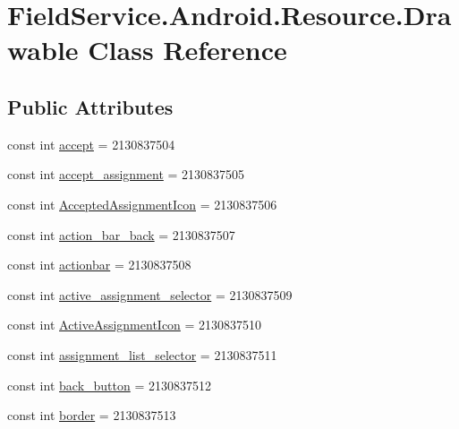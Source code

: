 \hypertarget{class_field_service_1_1_android_1_1_resource_1_1_drawable}{\section{Field\+Service.\+Android.\+Resource.\+Drawable Class Reference}
\label{class_field_service_1_1_android_1_1_resource_1_1_drawable}
}
\subsection*{Public Attributes}
\begin{DoxyCompactItemize}
\item 
const int \hyperlink{class_field_service_1_1_android_1_1_resource_1_1_drawable_ad013b2e6443b9014fe80a8e59c9bb71c}{accept} = 2130837504
\item 
const int \hyperlink{class_field_service_1_1_android_1_1_resource_1_1_drawable_ae043a030a051284c29e6a9320c95e488}{accept\+\_\+assignment} = 2130837505
\item 
const int \hyperlink{class_field_service_1_1_android_1_1_resource_1_1_drawable_a6e30bb07d84123dba13d9adfe455ab4d}{Accepted\+Assignment\+Icon} = 2130837506
\item 
const int \hyperlink{class_field_service_1_1_android_1_1_resource_1_1_drawable_a2bfa32340ccc1e11c820c29d106cc2a9}{action\+\_\+bar\+\_\+back} = 2130837507
\item 
const int \hyperlink{class_field_service_1_1_android_1_1_resource_1_1_drawable_acbe6f5b1c0dae0870d53bc9fe62fa617}{actionbar} = 2130837508
\item 
const int \hyperlink{class_field_service_1_1_android_1_1_resource_1_1_drawable_aaf047ecef0304875a6388cecf7bad093}{active\+\_\+assignment\+\_\+selector} = 2130837509
\item 
const int \hyperlink{class_field_service_1_1_android_1_1_resource_1_1_drawable_a23251c3e54f1050bc84433bf8dc48de4}{Active\+Assignment\+Icon} = 2130837510
\item 
const int \hyperlink{class_field_service_1_1_android_1_1_resource_1_1_drawable_a1c49de19e05ed4b50ccb072ee03bdfd9}{assignment\+\_\+list\+\_\+selector} = 2130837511
\item 
const int \hyperlink{class_field_service_1_1_android_1_1_resource_1_1_drawable_a0489a47ccac045542178ef579ab43cee}{back\+\_\+button} = 2130837512
\item 
const int \hyperlink{class_field_service_1_1_android_1_1_resource_1_1_drawable_a474b2c6bdb34a4b630f8a5252ff2ba53}{border} = 2130837513

\end{DoxyCompactItemize}
